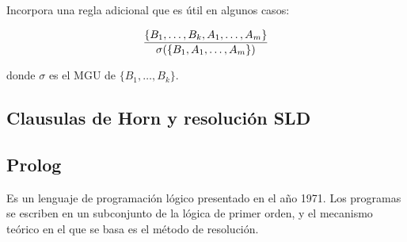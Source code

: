 Incorpora una regla adicional que es útil en algunos casos: 

\[\frac{\{B_1,\dots,B_k,A_1,\dots,A_m\}}{\sigma(\{B_1,A_1,\dots,A_m\})}\]

donde $\sigma$ es el MGU de $\{B_1,\dots,B_k\}$.

\subsection{Clausulas de Horn y resolución SLD}

\subsection{Prolog}

Es un lenguaje de programación lógico presentado en el año 1971. Los programas se escriben en un subconjunto de la lógica de primer orden, y el mecanismo teórico en el que se basa es el método de resolución.
